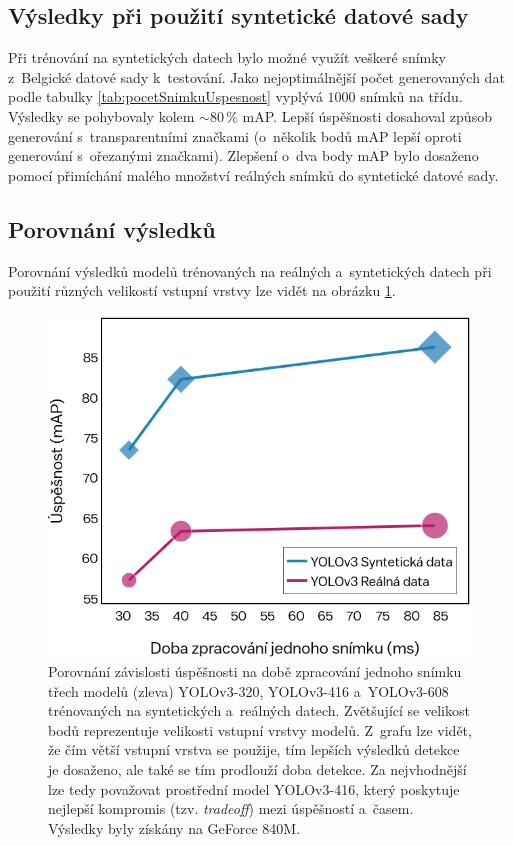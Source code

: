 \subsection*{Výsledky při použití syntetické datové sady}
\label{vysledkySyntDataset}
Při trénování na syntetických datech bylo možné využít veškeré snímky z~Belgické datové sady k~testování. Jako nejoptimálnější počet generovaných dat podle tabulky \ref{tab:pocetSnimkuUspesnost} vyplývá $1000$ snímků na třídu. Výsledky se pohybovaly kolem $\sim80\,\%$ mAP. Lepší úspěšnosti dosahoval způsob generování s~transparentními značkami (o~několik bodů mAP lepší oproti generování s~ořezanými značkami). Zlepšení o~dva body mAP bylo dosaženo pomocí přimíchání malého množství reálných snímků do syntetické datové sady.

\subsection*{Porovnání výsledků}
Porovnání výsledků modelů trénovaných na reálných a~syntetických datech při použití různých velikostí vstupní vrstvy lze vidět na obrázku \ref{fig:porovnaniMapMs}.

\begin{figure}[H]\centering
    \centering
    \includegraphics[width=0.6\linewidth]{figures/vyhodnoceni/map_ms_tradeoff.png}
    \caption{Porovnání závislosti úspěšnosti na době zpracování jednoho snímku třech modelů (zleva) YOLOv3-320, YOLOv3-416 a~YOLOv3-608 trénovaných na syntetických a~reálných datech. Zvětšující se velikost bodů reprezentuje velikosti vstupní vrstvy modelů. Z~grafu lze vidět, že čím větší vstupní vrstva se použije, tím lepších výsledků detekce je dosaženo, ale také se tím prodlouží doba detekce. Za nejvhodnější lze tedy považovat prostřední model YOLOv3-416, který poskytuje nejlepší kompromis (tzv. \emph{tradeoff}) mezi úspěšností a~časem. Výsledky byly získány na GeForce 840M.}
    \label{fig:porovnaniMapMs}
\end{figure}


